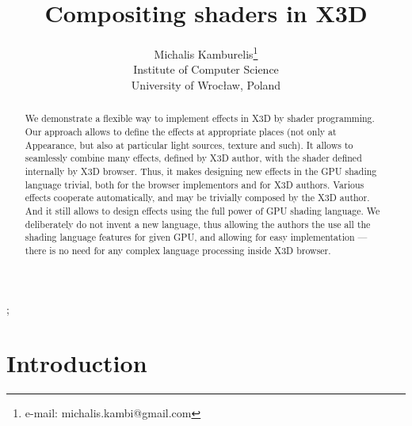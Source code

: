 \documentclass{acmsiggraph}                     %
\title{Compositing shaders in X3D}
\author{Michalis Kamburelis\thanks{e-mail: michalis.kambi@gmail.com}\\Institute of Computer Science\\University of Wroc{\l}aw, Poland}
\begin{document}

\maketitle

\begin{abstract}
We demonstrate a flexible way to implement effects in X3D \cite{x3d:spec}
by shader programming.
Our approach allows to define the effects at appropriate places
(not only at Appearance, but also at particular light sources, texture and such).
It allows to seamlessly combine many effects, defined by X3D author,
with the shader defined internally by X3D browser.
Thus, it makes designing new effects in the GPU shading language trivial,
both for the browser implementors and for X3D authors. Various effects
cooperate automatically, and may be trivially composed by the X3D author.
And it still allows to design effects using the full power of GPU shading
language. We deliberately do not invent a new language, thus allowing
the authors the use all the shading language features for given GPU,
and allowing for easy implementation --- there is no need for any complex
language processing inside X3D browser.
\end{abstract}

\begin{CRcatlist}
  ;
\end{CRcatlist}

\keywordlist

\section{Introduction}

\copyrightspace
\end{document}
